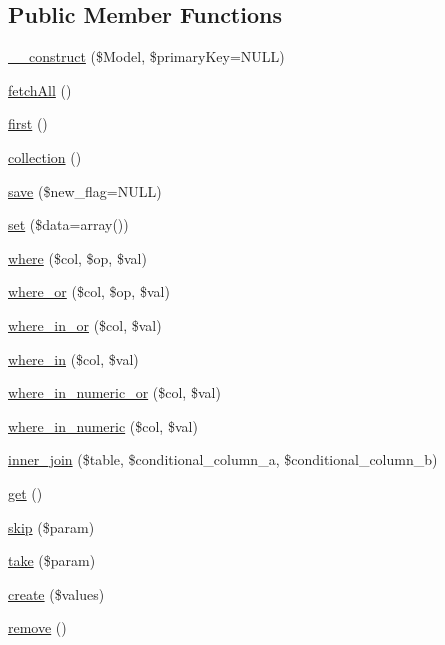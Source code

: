 \subsection*{Public Member Functions}
\begin{DoxyCompactItemize}
\item 
\hyperlink{class_linda_model_a776f84c759a8aa1820e5c65719897d8d}{\+\_\+\+\_\+construct} (\$Model, \$primary\+Key=N\+U\+L\+L)
\item 
\hyperlink{class_linda_model_af008f367d5ca054454dacc1e8830d7fd}{fetch\+All} ()
\item 
\hyperlink{class_linda_model_ac73eef9ff76ea330c0dab36ca448b90d}{first} ()
\item 
\hyperlink{class_linda_model_ab24fa179a41ab9c933c32181e3d3ed84}{collection} ()
\item 
\hyperlink{class_linda_model_a637f52fa554aa09e732a30691d68e172}{save} (\$new\+\_\+flag=N\+U\+L\+L)
\item 
\hyperlink{class_linda_model_a6b574d6569f95f11d7b1ba119185ac6d}{set} (\$data=array())
\item 
\hyperlink{class_linda_model_a7acfd032bb2a094c5e81d0183f713991}{where} (\$col, \$op, \$val)
\item 
\hyperlink{class_linda_model_a4c127fc509d13b318bc343c4753617ea}{where\+\_\+or} (\$col, \$op, \$val)
\item 
\hyperlink{class_linda_model_af2cd4e8ab564012941e2e5837a64419a}{where\+\_\+in\+\_\+or} (\$col, \$val)
\item 
\hyperlink{class_linda_model_a6978f186be10e963c0bbec845bad0347}{where\+\_\+in} (\$col, \$val)
\item 
\hyperlink{class_linda_model_aadb1463eecf640b9480079f5a0862ed3}{where\+\_\+in\+\_\+numeric\+\_\+or} (\$col, \$val)
\item 
\hyperlink{class_linda_model_a89f82f99daba9a8cc4c4f5756f05054c}{where\+\_\+in\+\_\+numeric} (\$col, \$val)
\item 
\hyperlink{class_linda_model_a208a1a59285ee5a95a90c5328f3ee31e}{inner\+\_\+join} (\$table, \$conditional\+\_\+column\+\_\+a, \$conditional\+\_\+column\+\_\+b)
\item 
\hyperlink{class_linda_model_ac33ee765f5ad9f134540bac393721cfe}{get} ()
\item 
\hyperlink{class_linda_model_a65cd50a6fdf5ce1f4a0e45ab930af5fa}{skip} (\$param)
\item 
\hyperlink{class_linda_model_a33ab6a5b47dfbefa83546cab6734f017}{take} (\$param)
\item 
\hyperlink{class_linda_model_a5297010b1eb7d2cce1e0f2ad8d6d8336}{create} (\$values)
\item 
\hyperlink{class_linda_model_aff9a1fb07dca963c2c9a8ffe66b45ded}{remove} ()
\end{DoxyCompactItemize}
